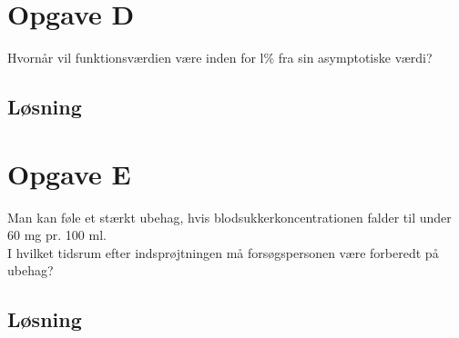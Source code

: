 \documentclass[a4paper, 11pt]{article}
\begin{document}
\section*{Opgave D} 
Hvornår vil funktionsværdien være inden for l\% fra sin asymptotiske værdi?
\subsection*{Løsning}

\section*{Opgave E} 
Man kan føle et stærkt ubehag, hvis blodsukkerkoncentrationen falder til under 60 mg pr. 100 ml. \\
I hvilket tidsrum efter indsprøjtningen må forsøgspersonen være forberedt på ubehag?
\subsection*{Løsning}
\end{document}
